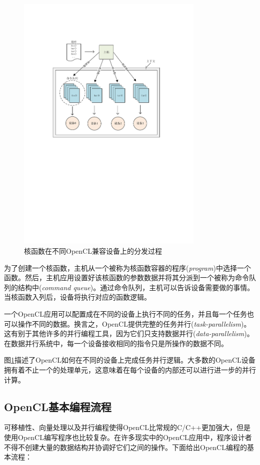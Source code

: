 \begin{figure}[htbp]
    \begin{center}
    \includegraphics[width=0.8\textwidth, height=0.75\textwidth]{figures/opencl.pdf}
    \end{center}
    \caption{核函数在不同OpenCL兼容设备上的分发过程}\label{figure:figure7}
\end{figure}

为了创建一个核函数，主机从一个被称为核函数容器的程序(\emph{program})中选择一个函数。然后，主机应用设置好该核函数的参数数据并将其分派到一个被称为命令队列的结构中(\emph{command queue})。通过命令队列，主机可以告诉设备需要做的事情。当核函数入列后，设备将执行对应的函数逻辑。

一个OpenCL应用可以配置成在不同的设备上执行不同的任务，并且每一个任务也可以操作不同的数据。换言之，OpenCL提供完整的任务并行(\emph{task-parallelism})。这有别于其他许多的并行编程工具，因为它们只支持数据并行(\emph{data-parallelism})。在数据并行系统中，每一个设备接收相同的指令只是所操作的数据不同。

图\ref{figure:figure7}描述了OpenCL如何在不同的设备上完成任务并行逻辑。大多数的OpenCL设备拥有着不止一个的处理单元，这意味着在每个设备的内部还可以进行进一步的并行计算。

\subsection{OpenCL基本编程流程}

可移植性、向量处理以及并行编程使得OpenCL比常规的C/C++更加强大，但是使用OpenCL编写程序也比较复杂。在许多现实中的OpenCL应用中，程序设计者不得不创建大量的数据结构并协调好它们之间的操作。下面给出OpenCL编程的基本流程：

